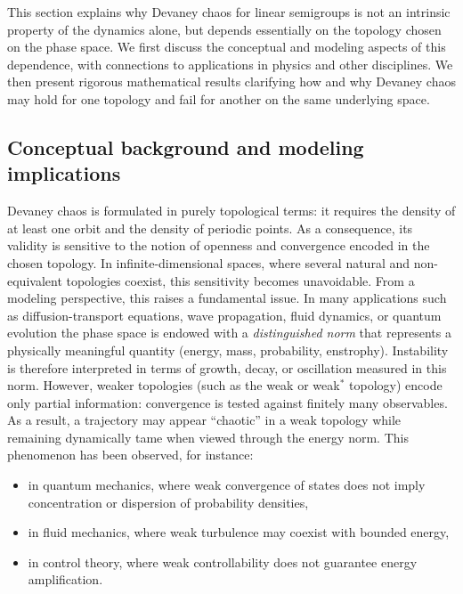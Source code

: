 \documentclass[12pt]{article}
\begin{document}
This section explains why Devaney chaos for linear semigroups is not an intrinsic property of the dynamics alone, but depends essentially on the topology chosen on the phase space. We first discuss the conceptual and modeling aspects of this dependence, with connections to applications in physics and other disciplines. We then present rigorous mathematical results clarifying how and why Devaney
chaos may hold for one topology and fail for another on the same underlying space.

\subsection{Conceptual background and modeling implications}
\label{subsec:conceptual_background}

Devaney chaos is formulated in purely topological terms: it requires the density of at least one orbit and the density of periodic points. As a consequence, its validity is sensitive to the notion of openness and convergence encoded in the chosen topology. In infinite-dimensional spaces, where several natural and non-equivalent topologies coexist, this sensitivity becomes unavoidable.
From a modeling perspective, this raises a fundamental issue. In many applications such as diffusion-transport equations, wave propagation, fluid dynamics, or quantum evolution the phase space is endowed with a \emph{distinguished norm} that represents a physically meaningful quantity (energy, mass, probability,
enstrophy). Instability is therefore interpreted in terms of growth, decay, or oscillation measured in this norm. However, weaker topologies (such as the weak or weak$^\ast$ topology) encode only
partial information: convergence is tested against finitely many observables. As a result, a trajectory may appear ``chaotic'' in a weak topology while remaining dynamically tame when viewed through the energy norm. This phenomenon has been observed, for instance:
\begin{itemize}
\item in quantum mechanics, where weak convergence of states does not imply concentration or dispersion of probability densities,
\item in fluid mechanics, where weak turbulence may coexist with bounded energy,
\item in control theory, where weak controllability does not guarantee energy
amplification.
\end{itemize}
\end{document}
